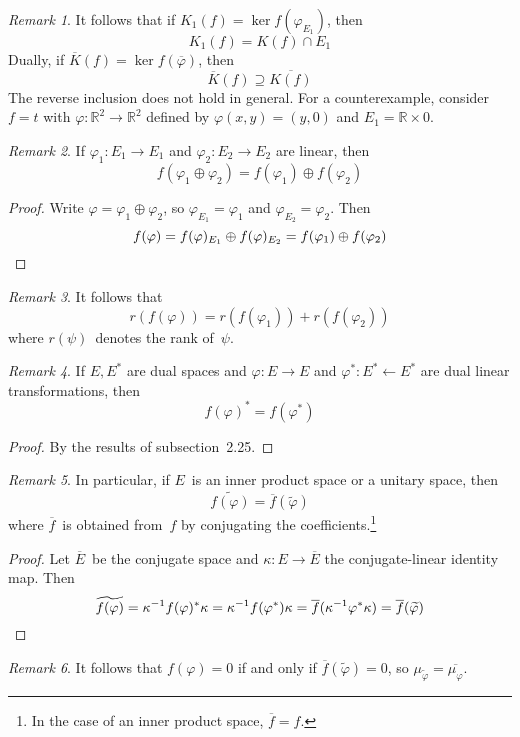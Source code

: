\documentclass[letterpaper,12pt]{article}
\newcommand{\R}{\mathbb{R}}
\newcommand{\from}{\leftarrow}
\newcommand{\sect}{\cap}
\newcommand{\dsum}{\oplus}
\newcommand{\adj}[1]{\widetilde{#1}}
\newcommand{\conj}[1]{\overline{#1}}
\newcommand{\proj}[1]{\overline{#1}}
\theoremstyle{definition}
\theoremstyle{remark}
\newtheorem*{rmk}{Remark}
\begin{document}
\begin{rmk}
It follows that if \(K_1(f)=\ker f(\varphi_{E_1})\), then
\[K_1(f)=K(f)\sect E_1\]
Dually, if \(\proj{K}(f)=\ker f(\proj{\varphi})\), then
\[\proj{K}(f)\supseteq\proj{K(f)}\]
The reverse inclusion does not hold in general. For a counterexample, consider \(f=t\) with \(\varphi:\R^2\to\R^2\) defined by \(\varphi(x,y)=(y,0)\) and \(E_1=\R\times 0\).
\end{rmk}

\begin{rmk}
If \(\varphi_1:E_1\to E_1\) and \(\varphi_2:E_2\to E_2\) are linear, then
\[f(\varphi_1\dsum\varphi_2)=f(\varphi_1)\dsum f(\varphi_2)\]
\end{rmk}
\begin{proof}
Write \(\varphi=\varphi_1\dsum\varphi_2\), so \(\varphi_{E_1}=\varphi_1\) and \(\varphi_{E_2}=\varphi_2\). Then
\[f(\varphi)=f(\varphi)_{E_1}\dsum f(\varphi)_{E_2}=f(\varphi_1)\dsum f(\varphi_2)\qedhere\]
\end{proof}

\begin{rmk}
It follows that
\[r(f(\varphi))=r(f(\varphi_1))+r(f(\varphi_2))\]
where \(r(\psi)\)~denotes the rank of~\(\psi\).
\end{rmk}

\begin{rmk}
If \(E,E^*\) are dual spaces and \(\varphi:E\to E\) and \(\varphi^*:E^*\from E^*\) are dual linear transformations, then
\[f(\varphi)^*=f(\varphi^*)\]
\end{rmk}
\begin{proof}
By the results of subsection~2.25.
\end{proof}

\begin{rmk}
In particular, if \(E\)~is an inner product space or a unitary space, then
\[\adj{f(\varphi)}=\conj{f}(\adj{\varphi})\]
where \(\conj{f}\)~is obtained from~\(f\) by conjugating the coefficients.\footnote{In the case of an inner product space, \(\conj{f}=f\).}
\end{rmk}
\begin{proof}
Let \(\conj{E}\)~be the conjugate space and \(\kappa:E\to\conj{E}\) the conjugate-linear identity map. Then
\[\adj{f(\varphi)}=\kappa^{-1}f(\varphi)^*\kappa=\kappa^{-1}f(\varphi^*)\kappa=\conj{f}(\kappa^{-1}\varphi^*\kappa)=\conj{f}(\adj{\varphi})\qedhere\]
\end{proof}

\begin{rmk}
It follows that \(f(\varphi)=0\) if and only if \(\conj{f}(\adj{\varphi})=0\), so \(\mu_{\adj{\varphi}}=\conj{\mu_{\varphi}}\).
\end{rmk}
\end{document}
